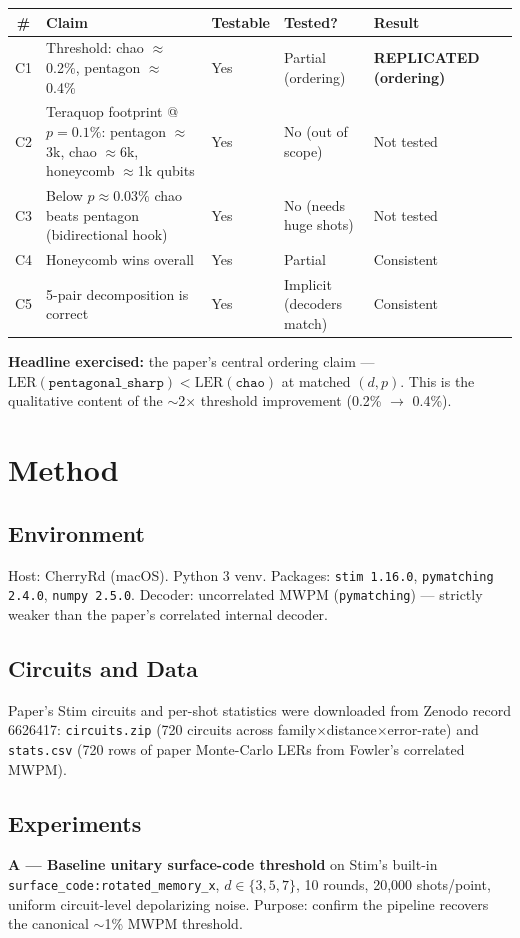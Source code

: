 \documentclass[11pt]{article}
\begin{document}
\begin{longtable}{clllll}
\toprule
\# & Claim & Testable & Tested? & Result \\
\midrule
C1 & Threshold: chao $\approx$ 0.2\%, pentagon $\approx$ 0.4\% & Yes & Partial (ordering) & \textbf{REPLICATED (ordering)} \\
C2 & Teraquop footprint @ $p=0.1\%$: pentagon $\approx$3k, chao $\approx$6k, honeycomb $\approx$1k qubits & Yes & No (out of scope) & Not tested \\
C3 & Below $p \approx 0.03\%$ chao beats pentagon (bidirectional hook) & Yes & No (needs huge shots) & Not tested \\
C4 & Honeycomb wins overall & Yes & Partial & Consistent \\
C5 & 5-pair decomposition is correct & Yes & Implicit (decoders match) & Consistent \\
\bottomrule
\end{longtable}

\textbf{Headline exercised:} the paper's central ordering claim ---
$\text{LER}(\texttt{pentagonal\_sharp}) < \text{LER}(\texttt{chao})$ at
matched $(d,p)$. This is the qualitative content of the $\sim$2$\times$
threshold improvement (0.2\% $\to$ 0.4\%).

\section{Method}

\subsection{Environment}
Host: CherryRd (macOS). Python 3 venv. Packages: \texttt{stim 1.16.0},
\texttt{pymatching 2.4.0}, \texttt{numpy 2.5.0}. Decoder: uncorrelated MWPM
(\texttt{pymatching}) --- strictly weaker than the paper's correlated
internal decoder.

\subsection{Circuits and Data}
Paper's Stim circuits and per-shot statistics were downloaded from Zenodo
record 6626417: \texttt{circuits.zip} (720 circuits across
family$\times$distance$\times$error-rate) and \texttt{stats.csv} (720 rows of
paper Monte-Carlo LERs from Fowler's correlated MWPM).

\subsection{Experiments}
\textbf{A --- Baseline unitary surface-code threshold} on Stim's built-in
\texttt{surface\_code:rotated\_memory\_x}, $d\in\{3,5,7\}$, 10 rounds, 20{,}000
shots/point, uniform circuit-level depolarizing noise. Purpose: confirm the
pipeline recovers the canonical $\sim$1\% MWPM threshold.
\end{document}
